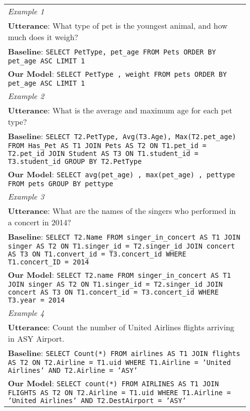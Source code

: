 \documentclass[letterpaper]{article} \usepackage{aaai21}  \usepackage{times}  \usepackage{helvet} \usepackage{courier}  \usepackage[hyphens]{url}  \usepackage{graphicx} \usepackage{booktabs}
\begin{document}
\begin{table*}[t]
  \centering \small
    \begin{tabularx}{\linewidth}{L{0.97 \linewidth}}
    \toprule
    \textit{Example 1} \\
    \textbf{Utterance}: What type of pet is the youngest animal, and how much does it weigh? \\
    \textbf{Baseline}: \texttt{SELECT PetType, pet\_age FROM Pets ORDER BY pet\_age ASC LIMIT 1} \\
    \textbf{Our Model}: \texttt{SELECT PetType ,  weight FROM pets ORDER BY pet\_age ASC LIMIT 1} \\
    \midrule 
    \textit{Example 2} \\
    \textbf{Utterance}: What is the average and maximum age for each pet type? \\
    \textbf{Baseline}: \texttt{SELECT T2.PetType, Avg(T3.Age), Max(T2.pet\_age) FROM Has\_Pet AS T1 JOIN Pets AS T2 ON T1.pet\_id = T2.pet\_id JOIN Student AS T3 ON T1.student\_id = T3.student\_id GROUP BY T2.PetType} \\
    \textbf{Our Model}: \texttt{SELECT avg(pet\_age) ,  max(pet\_age) ,  pettype FROM pets GROUP BY pettype} \\
    \midrule \midrule
    \textit{Example 3} \\
    \textbf{Utterance}: What are the names of the singers who performed in a concert in 2014? \\
    \textbf{Baseline}: \texttt{SELECT T2.Name FROM singer\_in\_concert AS T1 JOIN singer AS T2 ON T1.singer\_id = T2.singer\_id JOIN concert AS T3 ON T1.convert\_id = T3.concert\_id WHERE T1.concert\_ID = 2014} \\
    \textbf{Our Model}: \texttt{SELECT T2.name FROM singer\_in\_concert AS T1 JOIN singer AS T2 ON T1.singer\_id  =  T2.singer\_id JOIN concert AS T3 ON T1.concert\_id  =  T3.concert\_id WHERE T3.year  =  2014} \\
    \midrule 
    \textit{Example 4} \\
    \textbf{Utterance}: Count the number of United Airlines flights arriving in ASY Airport. \\
    \textbf{Baseline}: \texttt{SELECT Count(*) FROM airlines AS T1 JOIN flights AS T2 ON T2.Airline = T1.uid WHERE T1.Airline = 'United Airlines' AND T2.Airline = 'ASY'} \\
    \textbf{Our Model}: \texttt{SELECT count(*) FROM AIRLINES AS T1 JOIN FLIGHTS AS T2 ON T2.Airline  =  T1.uid WHERE T1.Airline  =  'United Airlines' AND T2.DestAirport  =  'ASY'} \\

\end{tabularx}
\end{table*}
\end{document}
